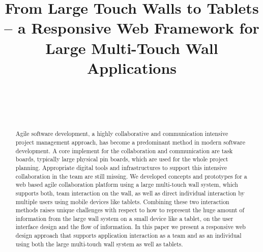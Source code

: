 \documentclass{sigchi}
\begin{document}
\title{From Large Touch Walls to Tablets -- a Responsive Web Framework for Large Multi-Touch Wall Applications}

\author{%
  \\
  \\
  \\
}

\maketitle



\begin{abstract}
Agile software development, a highly collaborative and communication intensive project management approach, has become a predominant method in modern software development. A core implement for the collaboration and communication are task boards, typically large physical pin boards, which are used for the whole project planning.  Appropriate digital tools and infrastructures to support this intensive collaboration in the team are still missing. 
We developed concepts and prototypes for a web based agile collaboration platform using a large multi-touch wall system, which supports both, team interaction on the wall, as well as direct individual interaction by multiple users using mobile devices like tablets. Combining these two interaction methods raises unique challenges with respect to how to represent the huge amount of information from the large wall system on a small device like a tablet, on the user interface design and the flow of information.
In this paper we present a responsive web design approach that supports application interaction as a team and as an individual using both the large multi-touch wall system as well as tablets.
\end{abstract}
\end{document}
